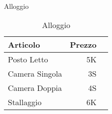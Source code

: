 \iffullversion
\begin{table}
  \begin{center}
    {\Large\sc Alloggio}\medskip

    \small\begin{tabular}{|l|r|l|}
      \hline
      Articolo& Prezzo \\ \hline
      \hline
      Posto Letto&5K \\ \hline
      Camera Singola&3S\\ \hline
      Camera Doppia&4S\\ \hline
      Stallaggio&6K\\ \hline
     \end{tabular}
    \caption{Alloggio}
  \end{center}         
\end{table}     
\fi

